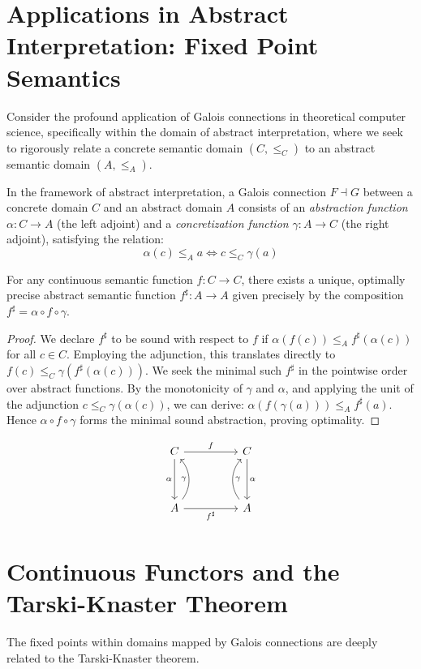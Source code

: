 \section{Applications in Abstract Interpretation: Fixed Point Semantics}
Consider the profound application of Galois connections in theoretical computer science, specifically within the domain of abstract interpretation, where we seek to rigorously relate a concrete semantic domain $(C, \leq_C)$ to an abstract semantic domain $(A, \leq_A)$.

\begin{definition}
In the framework of abstract interpretation, a Galois connection $F \dashv G$ between a concrete domain $C$ and an abstract domain $A$ consists of an \emph{abstraction function} $\alpha: C \to A$ (the left adjoint) and a \emph{concretization function} $\gamma: A \to C$ (the right adjoint), satisfying the relation:
\[ \alpha(c) \leq_A a \iff c \leq_C \gamma(a) \]
\end{definition}

\begin{theorem}
For any continuous semantic function $f: C \to C$, there exists a unique, optimally precise abstract semantic function $f^\sharp: A \to A$ given precisely by the composition $f^\sharp = \alpha \circ f \circ \gamma$.
\end{theorem}
\begin{proof}
We declare $f^\sharp$ to be sound with respect to $f$ if $\alpha(f(c)) \leq_A f^\sharp(\alpha(c))$ for all $c \in C$.
Employing the adjunction, this translates directly to $f(c) \leq_C \gamma(f^\sharp(\alpha(c)))$.
We seek the minimal such $f^\sharp$ in the pointwise order over abstract functions.
By the monotonicity of $\gamma$ and $\alpha$, and applying the unit of the adjunction $c \leq_C \gamma(\alpha(c))$, we can derive:
$\alpha(f(\gamma(a))) \leq_A f^\sharp(a)$. Hence $\alpha \circ f \circ \gamma$ forms the minimal sound abstraction, proving optimality.
\end{proof}

\[\begin{tikzcd}[row sep=huge, column sep=huge]
C \arrow[r, "f"] \arrow[d, "\alpha"'] & C \arrow[d, "\alpha"] \\
A \arrow[r, "f^\sharp"'] \arrow[u, "\gamma", bend right=40] & A \arrow[u, "\gamma"', bend right=-40]
\end{tikzcd}\]

\section{Continuous Functors and the Tarski-Knaster Theorem}
The fixed points within domains mapped by Galois connections are deeply related to the Tarski-Knaster theorem.

